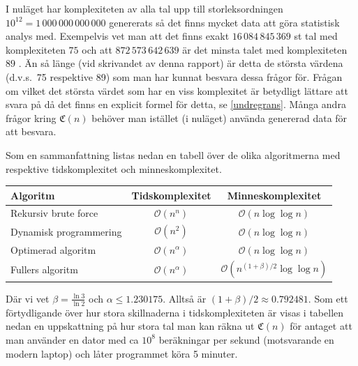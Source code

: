 \documentclass[a4paper,titlepage]{article}
\newcommand{\C}[1]{\mathfrak C \left( #1 \right)}
\renewcommand{\O}{\mathcal {O}}
\theoremstyle{definition}
\begin{document}
        I nuläget har komplexiteten av alla tal upp till
        storleksordningen $10^{12} = 1\,000\,000\,000\,000$ genererats så det finns mycket data
        att göra statistisk analys med. Exempelvis vet man att det finns exakt
        $16\,084\,845\,369$ st tal med komplexiteten $75$ och att
        $872\,573\,642\,639$ är det minsta talet med komplexiteten $89$
        \cite{spansk}. Än så länge (vid skrivandet av denna rapport) är detta de
        största värdena (d.v.s.\ 75 respektive 89) som man har kunnat besvara
        dessa frågor för.  Frågan om vilket det största värdet som har en viss
        komplexitet är betydligt lättare att svara
        på då det finns en explicit formel för detta, se \cref{undregrans}.
        Många andra frågor kring $\C{n}$ behöver man istället (i
        nuläget) använda genererad data för att besvara.

        Som en sammanfattning listas nedan en tabell över de olika algoritmerna 
        med respektive tidskomplexitet och minneskomplexitet.


        \begin{table}[H]
        \begin{tabular}[pos]{|l | c | c |}
            \hline
            \textbf{Algoritm}       & \textbf{Tidskomplexitet} &  \textbf{Minneskomplexitet}\\ \hline
            Rekursiv brute force    & $\O(n^n)$      & $\O(n\log\log n)$ \\ \hline
            Dynamisk programmering  & $\O(n^2)$      & $\O(n\log\log n)$ \\ \hline
            Optimerad algoritm      & $\O(n^\alpha)$ & $\O(n\log\log n)$ \\ \hline
            Fullers algoritm       & $\O(n^\alpha)$ & $\O(n^{(1+\beta)/2}\log\log n)$\\ \hline
        \end{tabular}
        \end{table}
    
        \noindent
        Där vi vet $\beta=\frac{\ln 3}{\ln 2}$ och $\alpha \le 1.230175$. Alltså är
        $(1+\beta)/2 \approx 0.792481$. Som ett förtydligande över hur stora
        skillnaderna i tidskomplexiteten är visas i tabellen nedan en
        uppskattning på hur stora tal man kan räkna ut $\C{n}$ för antaget att
        man använder en dator med ca $10^8$ beräkningar per sekund (motsvarande
        en modern laptop) och låter programmet köra 5 minuter.
\end{document}
